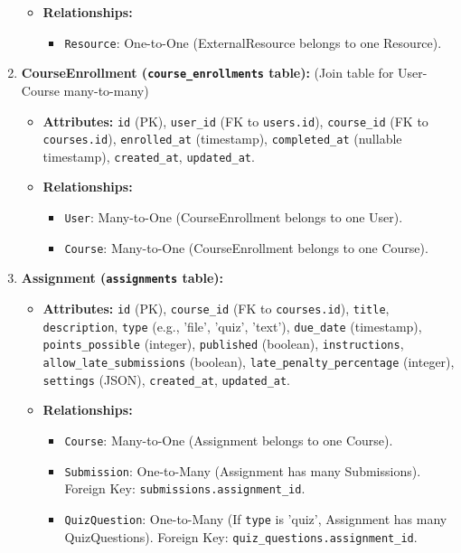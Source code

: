 \begin{enumerate}
\begin{itemize}
        \item \textbf{Relationships:}
        \begin{itemize}
            \item \texttt{Resource}: One-to-One (ExternalResource belongs to one Resource).
        \end{itemize}
    \end{itemize}
    \item \textbf{CourseEnrollment (\texttt{course\_enrollments} table):} (Join table for User-Course many-to-many)
    \begin{itemize}
        \item \textbf{Attributes:} \texttt{id} (PK), \texttt{user\_id} (FK to \texttt{users.id}), \texttt{course\_id} (FK to \texttt{courses.id}), \texttt{enrolled\_at} (timestamp), \texttt{completed\_at} (nullable timestamp), \texttt{created\_at}, \texttt{updated\_at}.
        \item \textbf{Relationships:}
        \begin{itemize}
            \item \texttt{User}: Many-to-One (CourseEnrollment belongs to one User).
            \item \texttt{Course}: Many-to-One (CourseEnrollment belongs to one Course).
        \end{itemize}
    \end{itemize}
    \item \textbf{Assignment (\texttt{assignments} table):}
    \begin{itemize}
        \item \textbf{Attributes:} \texttt{id} (PK), \texttt{course\_id} (FK to \texttt{courses.id}), \texttt{title}, \texttt{description}, \texttt{type} (e.g., 'file', 'quiz', 'text'), \texttt{due\_date} (timestamp), \texttt{points\_possible} (integer), \texttt{published} (boolean), \texttt{instructions}, \texttt{allow\_late\_submissions} (boolean), \texttt{late\_penalty\_percentage} (integer), \texttt{settings} (JSON), \texttt{created\_at}, \texttt{updated\_at}.
        \item \textbf{Relationships:}
        \begin{itemize}
            \item \texttt{Course}: Many-to-One (Assignment belongs to one Course).
            \item \texttt{Submission}: One-to-Many (Assignment has many Submissions). Foreign Key: \texttt{submissions.assignment\_id}.
            \item \texttt{QuizQuestion}: One-to-Many (If \texttt{type} is 'quiz', Assignment has many QuizQuestions). Foreign Key: \texttt{quiz\_questions.assignment\_id}.

\end{itemize}
\end{itemize}
\end{enumerate}
